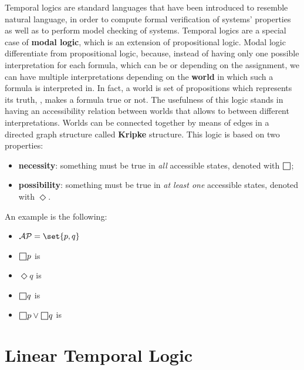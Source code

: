 \documentclass[oneside]{academica}
\begin{document}
Temporal logics are standard languages that have been introduced to resemble natural language, in order to compute formal verification of systems' properties as well as to perform model checking of systems.
Temporal logics are a special case of \textbf{modal logic}, which is an extension of propositional logic.
Modal logic differentiate from propositional logic, because, instead of having only one possible interpretation for each formula, which can be \true or \false depending on the assignment, we can have multiple interpretations depending on the \textbf{world} in which such a formula is interpreted in.
In fact, a world is set of propositions which represents its truth, \ie, makes a formula true or not.
The usefulness of this logic stands in having an accessibility relation between worlds that allows to  between different interpretations.
Worlds can be connected together by means of edges in a directed graph structure called \textbf{Kripke} structure.
This logic is based on two properties:
\begin{itemize}
  \item \textbf{necessity}: something must be true in \textit{all} accessible states, denoted with $\msquare$;
  \item \textbf{possibility}: something must be true in \textit{at least one} accessible states, denoted with $\Diamond$.
\end{itemize}
An example is the following:

\bigskip
\hspace{0.1\textwidth}
\begin{minipage}{0.4\textwidth}
  \begin{center}
    
  \end{center}
\end{minipage}
\begin{minipage}{0.4\textwidth}
  \begin{itemize}
    \item $\AP = \set{p,q}$
    \item $\msquare p$ is \true
    \item $\Diamond q$ is \true
    \item $\msquare q$ is \false
    \item $\msquare p \lor \msquare q$ is \true
  \end{itemize}
\end{minipage}

\section{Linear Temporal Logic}
\end{document}
